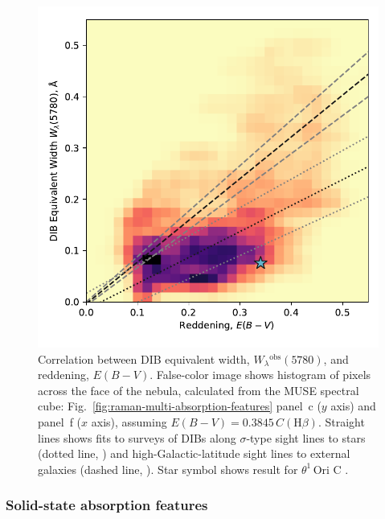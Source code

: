 \documentclass[useAMS, usenatbib, a4paper]{mnras}
\def\th#1#2{\ensuremath{\theta^{#1}\,\text{Ori~#2}}}
\newcommand\hb{\ensuremath{\text{H}\beta}}
\newcommand\observed{\ensuremath{^{\text{obs}}}}
\begin{document}
\begin{figure}
  \centering
  \includegraphics[width=\linewidth]{figs/correlation-DIB-reddening}
  \caption{
    Correlation between DIB equivalent width,
    \(W_\lambda\observed(5780)\), and reddening, \(E(B - V)\).
    False-color image shows histogram of pixels across the face of the nebula,
    calculated from the MUSE spectral cube: 
    Fig.~\ref{fig:raman-multi-absorption-features} panel~c (\(y\) axis)
    and panel~f (\(x\) axis), assuming \(E(B - V) = 0.3845\, C(\hb)\).
    Straight lines shows fits to surveys of DIBs along \(\sigma\)-type sight lines
    to stars (dotted line, \citealp{Kos:2013a})
    and high-Galactic-latitude sight lines to external galaxies
    (dashed line, \citealp{Baron:2015a}).
    Star symbol shows result for \th1C \citep{Friedman:2011a}.
  }
  \label{fig:dib-redden}
\end{figure}


\subsubsection{Solid-state absorption features}
\label{sec:solid-state-absorpt}
\end{document}
